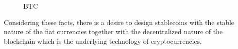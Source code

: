 \begin{figure}[!htb]
	\centering
	\hfill
	\caption{BTC}
	\label{fig:Comparison}
\end{figure}

Considering these facts, there is a desire to design stablecoins with the stable nature of the fiat currencies together with the decentralized nature of the blockchain which is the underlying technology of cryptocurrencies.


%	


